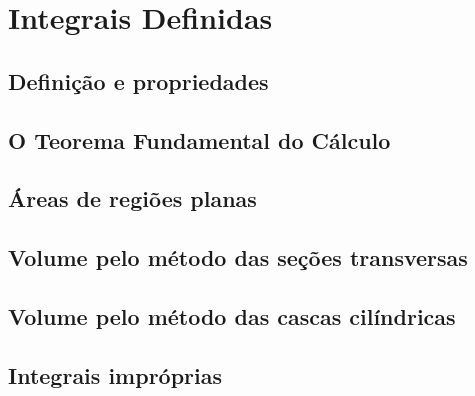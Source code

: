 \chapter{Integrais Definidas}
\label{cap:integrais_definidas}

\section{Definição e propriedades}

\section{O Teorema Fundamental do Cálculo}

\section{Áreas de regiões planas}

\section{Volume pelo método das seções transversas}

\section{Volume pelo método das cascas cilíndricas}

\section{Integrais impróprias}

